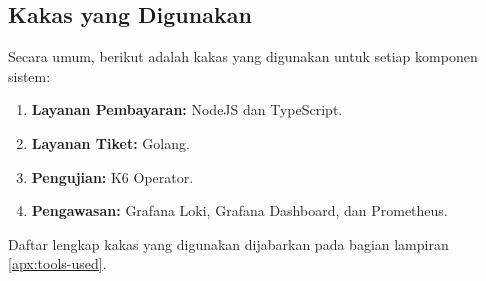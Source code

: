 \subsection{Kakas yang Digunakan}

Secara umum, berikut adalah kakas yang digunakan untuk setiap komponen sistem:

\begin{enumerate}
    \item \textbf{Layanan Pembayaran:} NodeJS dan TypeScript.
    \item \textbf{Layanan Tiket:} Golang.
    \item \textbf{Pengujian: } K6 Operator.
    \item \textbf{Pengawasan: } Grafana Loki, Grafana Dashboard, dan Prometheus.
\end{enumerate}

Daftar lengkap kakas yang digunakan dijabarkan pada bagian lampiran \ref{apx:tools-used}.